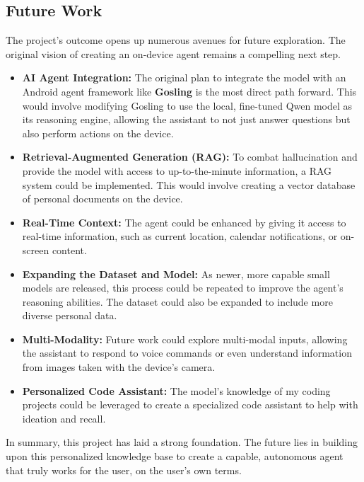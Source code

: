 \documentclass[conference]{IEEEtran}
\begin{document}
\subsection{Future Work}
The project's outcome opens up numerous avenues for future exploration. The original vision of creating an on-device agent remains a compelling next step.
\begin{itemize}
    \item \textbf{AI Agent Integration:} The original plan to integrate the model with an Android agent framework like \textbf{Gosling} \cite{block2024gosling} is the most direct path forward. This would involve modifying Gosling to use the local, fine-tuned Qwen model as its reasoning engine, allowing the assistant to not just answer questions but also perform actions on the device.
    \item \textbf{Retrieval-Augmented Generation (RAG):} To combat hallucination and provide the model with access to up-to-the-minute information, a RAG system could be implemented. This would involve creating a vector database of personal documents on the device.
    \item \textbf{Real-Time Context:} The agent could be enhanced by giving it access to real-time information, such as current location, calendar notifications, or on-screen content.
    \item \textbf{Expanding the Dataset and Model:} As newer, more capable small models are released, this process could be repeated to improve the agent's reasoning abilities. The dataset could also be expanded to include more diverse personal data.
    \item \textbf{Multi-Modality:} Future work could explore multi-modal inputs, allowing the assistant to respond to voice commands or even understand information from images taken with the device's camera.
    \item \textbf{Personalized Code Assistant:} The model's knowledge of my coding projects could be leveraged to create a specialized code assistant to help with ideation and recall.
\end{itemize}

In summary, this project has laid a strong foundation. The future lies in building upon this personalized knowledge base to create a capable, autonomous agent that truly works for the user, on the user's own terms.





\end{document}
